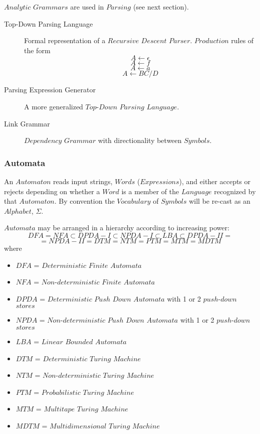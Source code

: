 \documentclass{article}
\begin{document}
    $Analytic$ $Grammars$ are used in $Parsing$ (see next section).

    \begin{description}
    \item[Top-Down Parsing Language] Formal representation of a
      $Recursive$ $Descent$ $Parser$. $Production$ rules of the form
    \[
        A \leftarrow \epsilon
    \]\[
        A \leftarrow f
    \]\[
        A \leftarrow a
    \]\[
        A \leftarrow BC/D
    \]
    \item[Parsing Expression Generator]
    A more generalized $Top$-$Down$ $Parsing$ $Language$.
    \item[Link Grammar]
    $Dependency$ $Grammar$ with directionality between $Symbols$.
    \end{description}

\subsubsection{Automata}
    An $Automaton$ reads input strings, $Words$ ($Expressions$), and
    either accepts or rejects depending on whether a $Word$ is a
    member of the $Language$ recognized by that $Automaton$. By
    convention the $Vocabulary$ of $Symbols$ will be re-cast as an
    $Alphabet$, $\Sigma$.

    $Automata$ may be arranged in a hierarchy according to increasing power:
    \[
        DFA = NFA \subset DPDA-I \subset NPDA-I \subset LBA \subset DPDA-II =
    \]\[
        = NPDA-II = DTM = NTM = PTM = MTM = MDTM
    \]
    where
    \begin{itemize}
    \item $DFA$ = $Deterministic$ $Finite$ $Automata$
    \item $NFA$ = $Non$-$deterministic$ $Finite$ $Automata$
    \item $DPDA$ = $Deterministic$ $Push$ $Down$ $Automata$ with 1
      or 2 $push$-$down$ $stores$
    \item $NPDA$ = $Non$-$deterministic$ $Push$ $Down$ $Automata$
      with 1 or 2 $push$-$down$ $stores$
    \item $LBA$ = $Linear$ $Bounded$ $Automata$
    \item $DTM$ = $Deterministic$ $Turing$ $Machine$
    \item $NTM$ = $Non$-$deterministic$ $Turing$ $Machine$
    \item $PTM$ = $Probabilistic$ $Turing$ $Machine$
    \item $MTM$ = $Multitape$ $Turing$ $Machine$
    \item $MDTM$ = $Multidimensional$ $Turing$ $Machine$
    \end{itemize}
\end{document}
